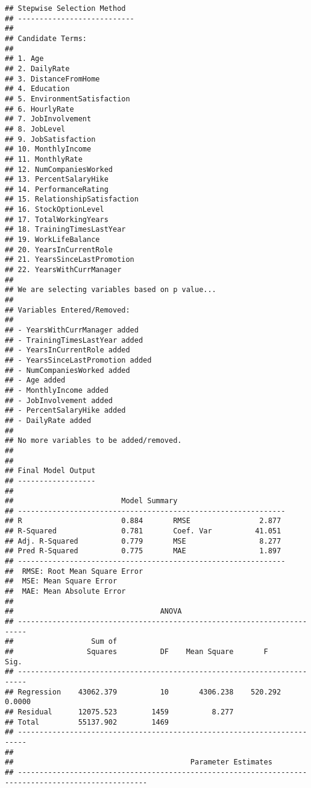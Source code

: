 \documentclass[]{article}
\begin{document}
\begin{verbatim}
## Stepwise Selection Method   
## ---------------------------
## 
## Candidate Terms: 
## 
## 1. Age 
## 2. DailyRate 
## 3. DistanceFromHome 
## 4. Education 
## 5. EnvironmentSatisfaction 
## 6. HourlyRate 
## 7. JobInvolvement 
## 8. JobLevel 
## 9. JobSatisfaction 
## 10. MonthlyIncome 
## 11. MonthlyRate 
## 12. NumCompaniesWorked 
## 13. PercentSalaryHike 
## 14. PerformanceRating 
## 15. RelationshipSatisfaction 
## 16. StockOptionLevel 
## 17. TotalWorkingYears 
## 18. TrainingTimesLastYear 
## 19. WorkLifeBalance 
## 20. YearsInCurrentRole 
## 21. YearsSinceLastPromotion 
## 22. YearsWithCurrManager 
## 
## We are selecting variables based on p value...
## 
## Variables Entered/Removed: 
## 
## - YearsWithCurrManager added 
## - TrainingTimesLastYear added 
## - YearsInCurrentRole added 
## - YearsSinceLastPromotion added 
## - NumCompaniesWorked added 
## - Age added 
## - MonthlyIncome added 
## - JobInvolvement added 
## - PercentSalaryHike added 
## - DailyRate added 
## 
## No more variables to be added/removed.
## 
## 
## Final Model Output 
## ------------------
## 
##                         Model Summary                          
## --------------------------------------------------------------
## R                       0.884       RMSE                2.877 
## R-Squared               0.781       Coef. Var          41.051 
## Adj. R-Squared          0.779       MSE                 8.277 
## Pred R-Squared          0.775       MAE                 1.897 
## --------------------------------------------------------------
##  RMSE: Root Mean Square Error 
##  MSE: Mean Square Error 
##  MAE: Mean Absolute Error 
## 
##                                  ANOVA                                   
## ------------------------------------------------------------------------
##                  Sum of                                                 
##                 Squares          DF    Mean Square       F         Sig. 
## ------------------------------------------------------------------------
## Regression    43062.379          10       4306.238    520.292    0.0000 
## Residual      12075.523        1459          8.277                      
## Total         55137.902        1469                                     
## ------------------------------------------------------------------------
## 
##                                         Parameter Estimates                                          
## ----------------------------------------------------------------------------------------------------

\end{verbatim}
\end{document}
